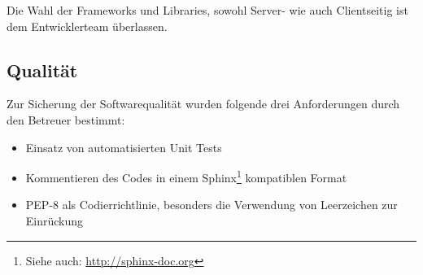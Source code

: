 Die Wahl der Frameworks und Libraries, sowohl Server- wie auch Clientseitig ist dem Entwicklerteam überlassen.

\subsection{Qualität}
Zur Sicherung der Softwarequalität wurden folgende drei Anforderungen durch den Betreuer bestimmt:

\begin{itemize}
	\item Einsatz von automatisierten Unit Tests
	\item Kommentieren des Codes in einem Sphinx\footnote{Siehe auch: \url{http://sphinx-doc.org}} kompatiblen Format
	\item PEP-8 als Codierrichtlinie, besonders die Verwendung von Leerzeichen zur Einrückung
\end{itemize}


